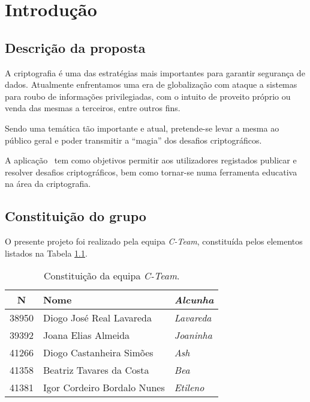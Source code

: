 \chapter{Introdução}
\label{chap:intro}

\section{Descrição da proposta}
\label{sec::intro:descricao}

A criptografia é uma das estratégias mais importantes para garantir segurança de dados. Atualmente enfrentamos uma era de globalização com ataque a sistemas para roubo de informações privilegiadas, com o intuito de proveito próprio ou venda das mesmas a terceiros, entre outros fins.

Sendo uma temática tão importante e atual, pretende-se levar a mesma ao público geral e poder transmitir a ``magia'' dos desafios criptográficos.

A aplicação \appname~tem como objetivos permitir aos utilizadores registados publicar e resolver desafios criptográficos, bem como tornar-se numa ferramenta educativa na área da criptografia.



\section{Constituição do grupo}
\label{sec::intro:grupo}

O presente projeto foi realizado pela equipa \textit{C-Team}, constituída pelos elementos listados na Tabela \ref{tab::c-team}.

\begin{table}[!h]
	\centering
	\begin{tabular}{c l >{\itshape}l}
		\toprule
		\textbf{N\textordmasculine} & \textbf{Nome} & \normalfont\textbf{Alcunha} \\
		\midrule
		38950 & Diogo José Real Lavareda    & Lavareda \\
		39392 & Joana Elias Almeida         & Joaninha \\
		41266 & Diogo Castanheira Simões    & Ash      \\
		41358 & Beatriz Tavares da Costa    & Bea      \\
		41381 & Igor Cordeiro Bordalo Nunes & Etileno  \\
		\bottomrule
	\end{tabular}
	\caption[Constituição da equipa \textit{C-Team}]{Constituição da equipa \textit{C-Team}.}
	\label{tab::c-team}
\end{table}



